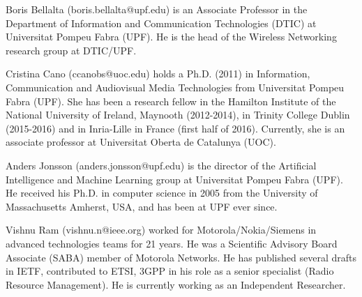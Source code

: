 \documentclass[journal]{IEEEtran}
\begin{document}
\begin{IEEEbiographynophoto}{Boris Bellalta}
(boris.bellalta@upf.edu) is an Associate Professor in the Department of Information and Communication Technologies (DTIC) at Universitat Pompeu Fabra (UPF). He is the head of the Wireless Networking research group at DTIC/UPF.
\end{IEEEbiographynophoto}

\begin{IEEEbiographynophoto}{Cristina Cano}
	(ccanobs@uoc.edu) holds a Ph.D. (2011) in Information, Communication and Audiovisual Media Technologies from Universitat Pompeu Fabra (UPF). She has been a research fellow in the Hamilton Institute of the National University of Ireland, Maynooth (2012-2014), in Trinity College Dublin (2015-2016) and in Inria-Lille in France (first half of 2016). Currently, she is an associate professor at Universitat Oberta de Catalunya (UOC). 
\end{IEEEbiographynophoto}

\begin{IEEEbiographynophoto}{Anders Jonsson}
(anders.jonsson@upf.edu) is the director of the Artificial Intelligence and Machine Learning group at Universitat Pompeu Fabra (UPF). He received his Ph.D. in computer science in 2005 from the University of Massachusetts Amherst, USA, and has been at UPF ever since.
\end{IEEEbiographynophoto}

\begin{IEEEbiographynophoto}{Vishnu Ram}
(vishnu.n@ieee.org) worked for Motorola/Nokia/Siemens in advanced technologies teams for 21 years. He was a Scientific Advisory Board Associate (SABA) member of Motorola Networks. He has published several drafts in IETF, contributed to ETSI, 3GPP in his role as a senior specialist (Radio Resource Management). He is currently working as an Independent Researcher.	
\end{IEEEbiographynophoto}

\vfill






\end{document}

